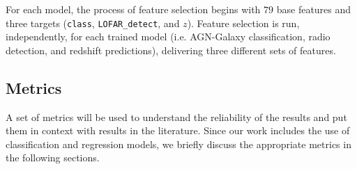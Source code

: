 \documentclass{aa}
\begin{document}


For each model, the process of feature selection begins with $79$ base features and three targets (\verb|class|, \verb|LOFAR_detect|, and $z$). Feature selection is run, independently, for each trained model (i.e. AGN-Galaxy classification, radio detection, and redshift predictions), delivering three different sets of features.

\subsection{Metrics}\label{sec:metrics}

A set of metrics will be used to understand the reliability of the results and put them in context with results in the literature. 
Since our work includes the use of classification and regression models, we briefly discuss the appropriate metrics in the following sections.
\end{document}
